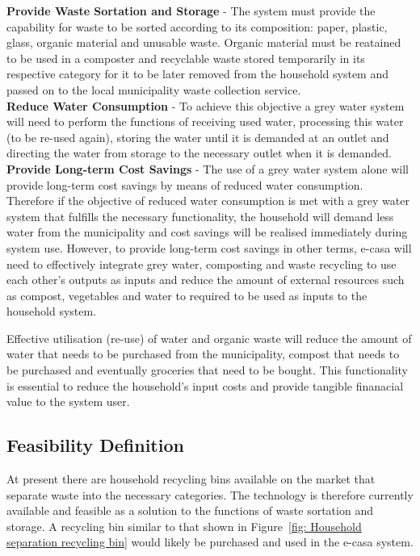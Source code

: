 \documentclass[a4paper,11pt,fleqn]{report}
\begin{document}
\noindent\textbf{Provide Waste Sortation and Storage} - The system must provide the capability for waste to be sorted according to its composition: paper, plastic, glass, organic material and unusable waste. Organic material must be reatained to be used in a composter and recyclable waste stored temporarily in its respective category for it to be later removed from the household system and passed on to the local municipality waste collection service.\\

\noindent\textbf{Reduce Water Consumption} - To achieve this objective a grey water system will need to perform the functions of receiving used water, processing this water (to be re-used again), storing the water until it is demanded at an outlet and directing the water from storage to the necessary outlet when it is demanded.\\

\noindent\textbf{Provide Long-term Cost Savings} - The use of a grey water system alone will provide long-term cost savings by means of reduced water consumption. Therefore if the objective of reduced water consumption is met with a grey water system that fulfills the necessary functionality, the household will demand less water from the municipality and cost savings will be realised immediately during system use. However, to provide long-term cost savings in other terms, \ac{e-casa} will need to effectively integrate grey water, composting and waste recycling to use each other's outputs as inputs and reduce the amount of external resources such as compost, vegetables and water to required to be used as inputs to the household system.

Effective utilisation (re-use) of water and organic waste will reduce the amount of water that needs to be purchased from the municipality, compost that needs to be purchased and eventually groceries that need to be bought. This functionality is essential to reduce the household's input costs and provide tangible finanacial value to the system user.

\subsection{Feasibility Definition}
At present there are household recycling bins available on the market that separate waste into the necessary categories. The technology is therefore currently available and feasible as a solution to the functions of waste sortation and storage. A recycling bin similar to that shown in Figure~\ref{fig: Household separation recycling bin} would likely be purchased and used in the \ac{e-casa} system.
\end{document}

